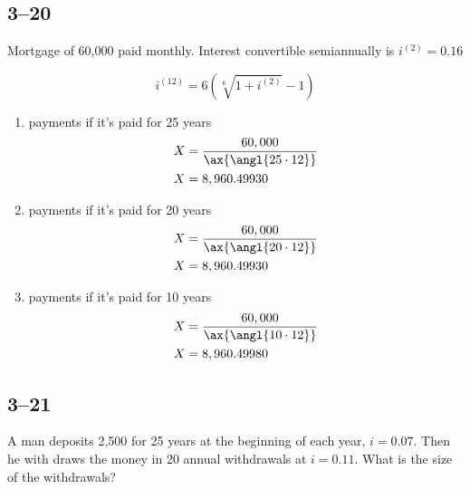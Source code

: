 \documentclass[a4paper, 12pt, reqno]{amsart}
\numberwithin{equation}{section}
\begin{document}
\subsection*{3--20}

Mortgage of 60,000 paid monthly. Interest convertible semiannually is $i^{(2)}
= 0.16$

\begin{equation}\nonumber
    i^{(12)} = 6(\sqrt[6]{1 + i^{(2)}} - 1)
\end{equation}

\begin{enumerate}[label=(\alph*)]
    \item payments if it's paid for 25 years
        \begin{equation}\nonumber
            \begin{aligned}
                X &= \frac{60,000}{\ax{\angl{25\cdot12}}}   \\
                X &= 8,960.49930
            \end{aligned}
        \end{equation}
    \item payments if it's paid for 20 years
        \begin{equation}\nonumber
            \begin{aligned}
                X &= \frac{60,000}{\ax{\angl{20\cdot12}}}   \\
                X &= 8,960.49930
            \end{aligned}
        \end{equation}
    \item payments if it's paid for 10 years
        \begin{equation}\nonumber
            \begin{aligned}
                X &= \frac{60,000}{\ax{\angl{10\cdot12}}}   \\
                X &= 8,960.49980
            \end{aligned}
        \end{equation}
\end{enumerate}

\subsection*{3--21}

A man deposits 2,500 for 25 years at the beginning of each year, $i=0.07$. Then
he with draws the money in 20 annual withdrawals at $i=0.11$. What is the size
of the withdrawals?
\end{document}
